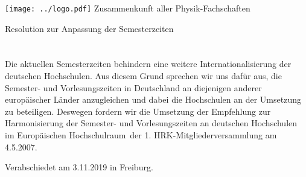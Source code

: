 \documentclass[DIV=calc]{scrartcl}
\begin{document}
\hspace{0.87\textwidth}
\begin{minipage}{120pt}
  \vspace{-1.8cm}
  \texttt{[image: ../logo.pdf]}
  \centering
  \small Zusammenkunft aller Physik-Fachschaften
\end{minipage}
\begin{center}
  \vspace{1cm}
  \huge{Resolution zur Anpassung der Semesterzeiten} \\
  \normalsize
\end{center}
\vspace{1cm}




\section*{}
Die aktuellen Semesterzeiten behindern eine weitere Internationalisierung der deutschen Hochschulen. Aus diesem Grund sprechen wir uns dafür aus, die Semester- und Vorlesungszeiten in  Deutschland an diejenigen anderer europäischer Länder anzugleichen und dabei  die Hochschulen an der Umsetzung zu beteiligen. Deswegen fordern wir die Umsetzung der \glqq Empfehlung zur Harmonisierung der Semester- und  Vorlesungszeiten an deutschen Hochschulen im Europäischen Hochschulraum\grqq \, der 1. HRK-Mitgliederversammlung am 4.5.2007.

\vspace{1cm}

\vfill
\begin{flushright}
Verabschiedet am 3.11.2019 in Freiburg.
\end{flushright}
\end{document}

